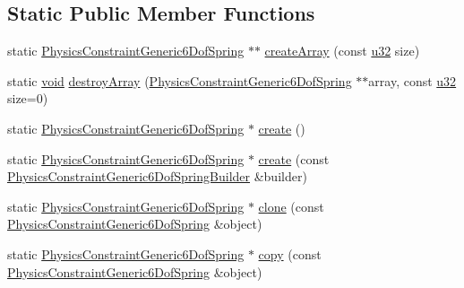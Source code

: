 \subsection*{Static Public Member Functions}
\begin{DoxyCompactItemize}
\item 
static \mbox{\hyperlink{classnjli_1_1_physics_constraint_generic6_dof_spring}{Physics\+Constraint\+Generic6\+Dof\+Spring}} $\ast$$\ast$ \mbox{\hyperlink{classnjli_1_1_physics_constraint_generic6_dof_spring_a1cd2d7b1a7bb8ef56286e178c95f99e7}{create\+Array}} (const \mbox{\hyperlink{_util_8h_a10e94b422ef0c20dcdec20d31a1f5049}{u32}} size)
\item 
static \mbox{\hyperlink{_thread_8h_af1e856da2e658414cb2456cb6f7ebc66}{void}} \mbox{\hyperlink{classnjli_1_1_physics_constraint_generic6_dof_spring_a29dd9a920f0c518800bd91270b761394}{destroy\+Array}} (\mbox{\hyperlink{classnjli_1_1_physics_constraint_generic6_dof_spring}{Physics\+Constraint\+Generic6\+Dof\+Spring}} $\ast$$\ast$array, const \mbox{\hyperlink{_util_8h_a10e94b422ef0c20dcdec20d31a1f5049}{u32}} size=0)
\item 
static \mbox{\hyperlink{classnjli_1_1_physics_constraint_generic6_dof_spring}{Physics\+Constraint\+Generic6\+Dof\+Spring}} $\ast$ \mbox{\hyperlink{classnjli_1_1_physics_constraint_generic6_dof_spring_a8a50fb176c1795f70770c7736b4b4f61}{create}} ()
\item 
static \mbox{\hyperlink{classnjli_1_1_physics_constraint_generic6_dof_spring}{Physics\+Constraint\+Generic6\+Dof\+Spring}} $\ast$ \mbox{\hyperlink{classnjli_1_1_physics_constraint_generic6_dof_spring_abdf988521a32e8f90555412f5521adf7}{create}} (const \mbox{\hyperlink{classnjli_1_1_physics_constraint_generic6_dof_spring_builder}{Physics\+Constraint\+Generic6\+Dof\+Spring\+Builder}} \&builder)
\item 
static \mbox{\hyperlink{classnjli_1_1_physics_constraint_generic6_dof_spring}{Physics\+Constraint\+Generic6\+Dof\+Spring}} $\ast$ \mbox{\hyperlink{classnjli_1_1_physics_constraint_generic6_dof_spring_a05eb797e000b0e4e1079fa55c3933e3d}{clone}} (const \mbox{\hyperlink{classnjli_1_1_physics_constraint_generic6_dof_spring}{Physics\+Constraint\+Generic6\+Dof\+Spring}} \&object)
\item 
static \mbox{\hyperlink{classnjli_1_1_physics_constraint_generic6_dof_spring}{Physics\+Constraint\+Generic6\+Dof\+Spring}} $\ast$ \mbox{\hyperlink{classnjli_1_1_physics_constraint_generic6_dof_spring_ad0f3a2c25060758c236a7341d45ec471}{copy}} (const \mbox{\hyperlink{classnjli_1_1_physics_constraint_generic6_dof_spring}{Physics\+Constraint\+Generic6\+Dof\+Spring}} \&object)

\end{DoxyCompactItemize}
